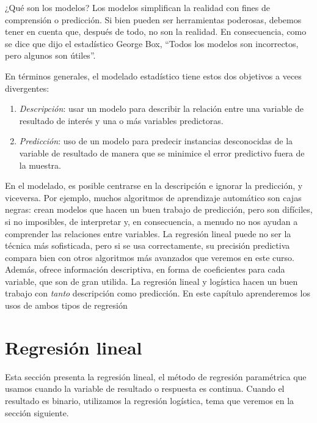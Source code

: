\documentclass[
]{book}
\begin{document}
¿Qué son los modelos? Los modelos simplifican la realidad con fines de comprensión o predicción. Si bien pueden ser herramientas poderosas, debemos tener en cuenta que, después de todo, no son la realidad. En consecuencia, como se dice que dijo el estadístico George Box, ``Todos los modelos son incorrectos, pero algunos son útiles''.

En términos generales, el modelado estadístico tiene estos dos objetivos a veces divergentes:

\begin{enumerate}
\def\labelenumi{\arabic{enumi}.}
\item
  \emph{Descripción}: usar un modelo para describir la relación entre una variable de resultado de interés y una o más variables predictoras.
\item
  \emph{Predicción}: uso de un modelo para predecir instancias desconocidas de la variable de resultado de manera que se minimice el error predictivo fuera de la muestra.
\end{enumerate}

En el modelado, es posible centrarse en la descripción e ignorar la predicción, y viceversa. Por ejemplo, muchos algoritmos de aprendizaje automático son cajas negras: crean modelos que hacen un buen trabajo de predicción, pero son difíciles, si no imposibles, de interpretar y, en consecuencia, a menudo no nos ayudan a comprender las relaciones entre variables. La regresión lineal puede no ser la técnica más sofisticada, pero si se usa correctamente, su precisión predictiva compara bien con otros algoritmos más avanzados que veremos en este curso. Además, ofrece información descriptiva, en forma de coeficientes para cada variable, que son de gran utilida. La regresión lineal y logística hacen un buen trabajo con \emph{tanto} descripción como predicción. En este capítulo aprenderemos los usos de ambos tipos de regresión

\hypertarget{regresiuxf3n-lineal}{%
\section{Regresión lineal}\label{regresiuxf3n-lineal}}

Esta sección presenta la regresión lineal, el método de regresión paramétrica que usamos cuando la variable de resultado o respuesta es continua. Cuando el resultado es binario, utilizamos la regresión logística, tema que veremos en la sección siguiente.
\end{document}
